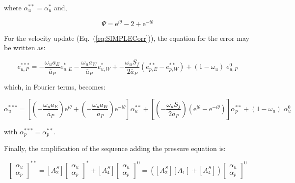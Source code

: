 \documentclass[final,3p,times,11pt,onecolumn]{myElsarticle}
\numberwithin{equation}{section}
\begin{document}
\noindent where $\alpha_u^{**} = \alpha_u^{*}$ and,

\begin{equation}
    \Psi = \text{e}^{i \theta} - 2 + \text{e}^{- i \theta}
\end{equation}

For the velocity update (Eq.~(\ref{eq:SIMPLECorr})), the equation for the error may be written as:

\begin{equation}
    e_{u,P}^{***} = -\dfrac{\omega_u a_E}{\overline{a}_P} e_{u,E}^{*} -\dfrac{\omega_u a_W}{\overline{a}_P} e_{u,W}^{*} +
                   -\dfrac{\omega_u S_f}{2 \overline{a}_P} (e_{p,E}^{**}-e_{p,W}^{**}) +
                   (1-\omega_u) \; e_{u,P}^0
\end{equation}

\noindent which, in Fourier terms, becomes:

\begin{equation}
    \alpha_{u}^{***} = \left[\left(-\dfrac{\omega_u a_E}{\overline{a}_P}\right) \text{e}^{i \theta} + \left(- \dfrac{\omega_u a_W}{\overline{a}_P}\right) \text{e}^{- i \theta}\right] \alpha_u^{**} +
                   \left[\left(-\dfrac{\omega_u S_f}{2 \overline{a}_P}\right) \left(\text{e}^{i \theta}-\text{e}^{-i \theta}\right) \right] \alpha_p^{**} +
                   (1-\omega_u) \; \alpha_u^0
\end{equation}

\noindent with $\alpha_p^{***}=\alpha_p^{**}$.

Finally, the amplification of the sequence adding the pressure equation is:

\begin{equation}
\begin{bmatrix}
\alpha_u \\
\alpha_p 
\end{bmatrix}^{**} =
[A^S_2]
\begin{bmatrix}
\alpha_u \\
\alpha_p 
\end{bmatrix}^{*} +
[A^S_4]
\begin{bmatrix}
\alpha_u \\
\alpha_p 
\end{bmatrix}^{0} =
([A^S_2] [A_1] + [A^S_4])
\begin{bmatrix}
\alpha_u \\
\alpha_p 
\end{bmatrix}^{0}
\end{equation}
\end{document}
